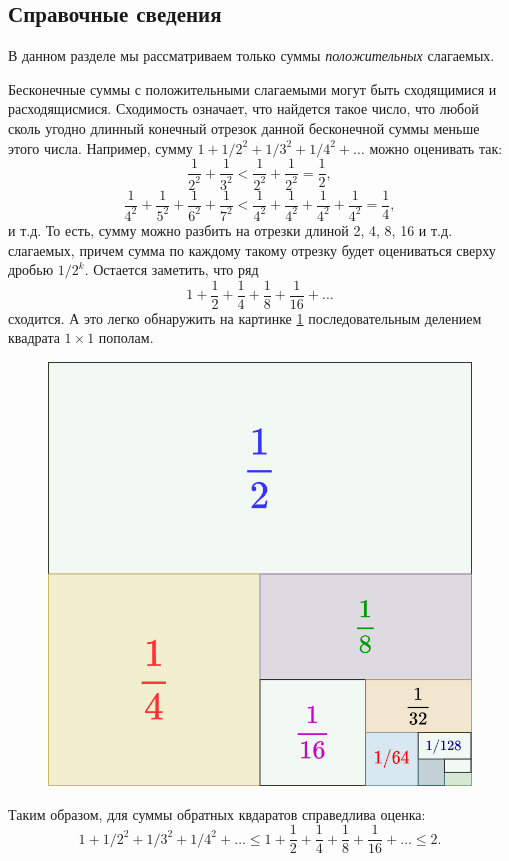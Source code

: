 \subsection*{Справочные сведения}

В данном разделе мы рассматриваем только суммы \textit{положительных} слагаемых.

Бесконечные суммы с положительными слагаемыми могут быть сходящимися и расходящисмися. Сходимость означает, что найдется такое число, что любой сколь угодно длинный конечный отрезок данной бесконечной суммы меньше этого числа. Например, сумму
$1+1/2^2+1/3^2+1/4^2+\dots$ можно оценивать так:
$$
\frac{1}{2^2}+\frac{1}{3^2}<\frac{1}{2^2}+\frac{1}{2^2}=\frac12,
$$
$$
\frac{1}{4^2}+\frac{1}{5^2}+\frac{1}{6^2}+\frac{1}{7^2}<\frac{1}{4^2}+\frac{1}{4^2}+\frac{1}{4^2}+\frac{1}{4^2}=\frac14,
$$
и т.д. То есть, сумму можно разбить на отрезки длиной 2, 4, 8, 16 и т.д. слагаемых, причем сумма по каждому такому отрезку будет оцениваться сверху дробью $1/2^k$. Остается заметить, что ряд
$$
1+\frac{1}{2}+\frac{1}{4}+\frac{1}{8}+\frac{1}{16}+\dots
$$
сходится. А это легко обнаружить на картинке \ref{geomseq} последовательным делением квадрата $1\times 1$ пополам.
\begin{figure}[hbt]
\begin{center}
\includegraphics[scale=0.3]{../geomseq.png}
\end{center}
\caption{}\label{geomseq}
\end{figure}
Таким образом, для суммы обратных квдаратов справедлива оценка:
$$
1+1/2^2+1/3^2+1/4^2+\dots \le 1+\frac{1}{2}+\frac{1}{4}+\frac{1}{8}+\frac{1}{16}+\dots \le 2.
$$

